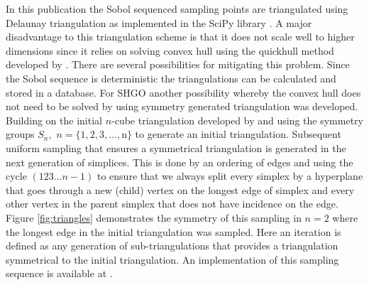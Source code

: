 In this publication the Sobol sequenced sampling points are triangulated using Delaunay triangulation as implemented in the SciPy library \cite{scipy}. A major disadvantage to this triangulation scheme is that it does not scale well to higher dimensions since it relies on solving convex hull using the quickhull method developed by \citet{Barber1996}. %
There are several possibilities for mitigating this problem. Since the Sobol sequence is deterministic the triangulations can be calculated and stored in a database. For SHGO another possibility whereby the convex hull does not need to be solved by using symmetry generated triangulation was developed. Building on the initial $n$-cube triangulation developed by \citeauthor{paulavivcius2014simplicial} \citep{paulavivcius2014simplicial, Zilinskas2016} and using the symmetry groups $S_n,$ $n = \{1, 2, 3, \dots, $n$\}$ to generate an initial triangulation. Subsequent uniform sampling that ensures a symmetrical triangulation is generated in the next generation of simplices. This is done by an ordering of edges and using the cycle $(123 \dots n-1)$ to ensure that we always split every simplex by a hyperplane that goes through a new (child) vertex on the longest edge of simplex and every other vertex in the parent simplex that does not have incidence on the edge. Figure \ref{fig:triangles} demonstrates the symmetry of this sampling in $n=2$ where the longest edge in the initial triangulation was sampled. Here an iteration is defined as any generation of sub-triangulations that provides a triangulation symmetrical to the initial triangulation. An implementation of this sampling sequence is available at \citet{SHGOpy}.

